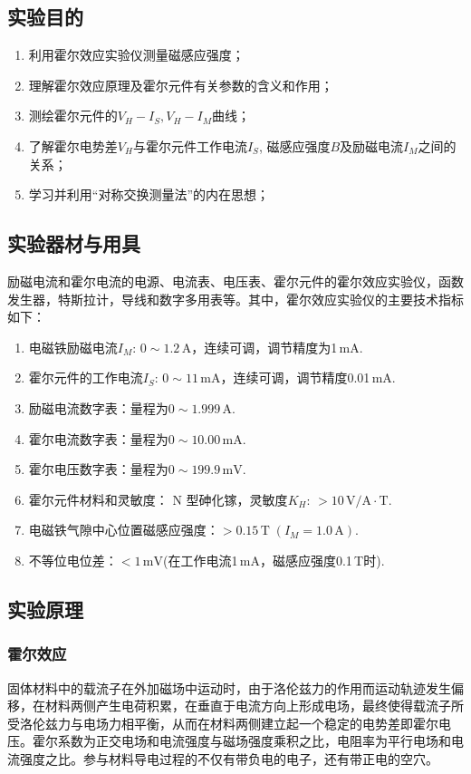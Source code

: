 \documentclass[UTF8]{article}
\theoremstyle{MyLineTheoremStyle} %
\theoremstyle{MyBlockTheoremStyle} %
\theoremstyle{MySubsubsectionStyle} %
\begin{document}
\subsection{实验目的}
\begin{enumerate}
\item 利用霍尔效应实验仪测量磁感应强度；
\item 理解霍尔效应原理及霍尔元件有关参数的含义和作用；
\item 测绘霍尔元件的$V_H-I_S,V_H-I_M$曲线；
\item 了解霍尔电势差$V_H$与霍尔元件工作电流$I_S$, 磁感应强度$B$及励磁电流$I_M$之间的关系；
\item 学习并利用“对称交换测量法”的内在思想；
\end{enumerate}


\subsection{实验器材与用具}
励磁电流和霍尔电流的电源、电流表、电压表、霍尔元件的霍尔效应实验仪，函数发生器，特斯拉计，导线和数字多用表等。其中，霍尔效应实验仪的主要技术指标如下：

\begin{enumerate}
\item 电磁铁励磁电流$ I_M:\,0\sim1.2\,\mathrm A $，连续可调，调节精度为1\,mA.
\item 霍尔元件的工作电流$ I_S:\,0\sim 11\,\mathrm{mA} $，连续可调，调节精度0.01\,mA.
\item 励磁电流数字表：量程为$ 0\sim 1.999\,\mathrm A $.
\item 霍尔电流数字表：量程为$ 0\sim 10.00\,\mathrm{mA} $.
\item 霍尔电压数字表：量程为$ 0\sim 199.9\,\mathrm{mV} $.
\item 霍尔元件材料和灵敏度： N 型砷化镓，灵敏度$ K_H:\,>10\,\mathrm{V/A\cdot T} $.
\item 电磁铁气隙中心位置磁感应强度：$ >0.15\,\mathrm T\;(I_M=1.0\,\mathrm A) $.
\item 不等位电位差：$ <1\,\mathrm{mV} $(在工作电流1\,mA，磁感应强度0.1\,T时).
\end{enumerate}


\subsection{实验原理}
\subsubsection{霍尔效应}
固体材料中的载流子在外加磁场中运动时，由于洛伦兹力的作用而运动轨迹发生偏移，在材料两侧产生电荷积累，在垂直于电流方向上形成电场，最终使得载流子所受洛伦兹力与电场力相平衡，从而在材料两侧建立起一个稳定的电势差即霍尔电压。霍尔系数为正交电场和电流强度与磁场强度乘积之比，电阻率为平行电场和电流强度之比。参与材料导电过程的不仅有带负电的电子，还有带正电的空穴。
\end{document}
